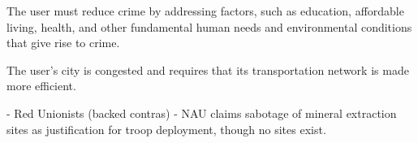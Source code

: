 The user must reduce crime by addressing factors, such as education, affordable living, health, and other fundamental human needs and environmental conditions that give rise to crime.


The user's city is congested and requires that its transportation network is made more efficient.






    - Red Unionists (backed contras)
    - NAU claims sabotage of mineral extraction sites as justification for troop deployment, though no sites exist.

\stopitemize
